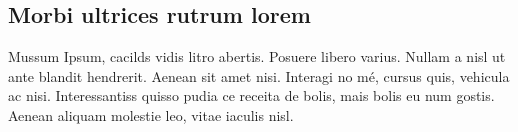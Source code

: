 \begin{anexosenv}

\partanexos

\chapter{Morbi ultrices rutrum lorem}

    Mussum Ipsum, cacilds vidis litro abertis. 
    Posuere libero varius. Nullam a nisl ut ante blandit hendrerit. 
    Aenean sit amet nisi. Interagi no mé, cursus quis, vehicula ac nisi. 
    Interessantiss quisso pudia ce receita de bolis, mais bolis eu num gostis. 
    Aenean aliquam molestie leo, vitae iaculis nisl. 
    
\end{anexosenv}